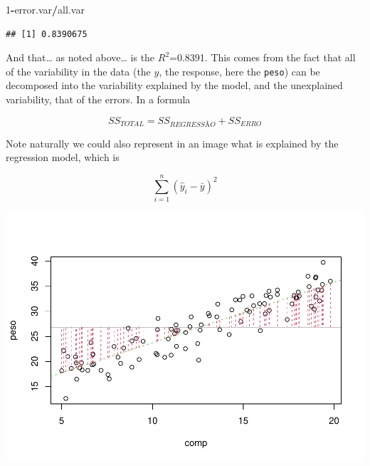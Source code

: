 \documentclass[
]{book}
\newenvironment{Shaded}{\begin{snugshade}}{\end{snugshade}}
\newcommand{\CommentTok}[1]{\textcolor[rgb]{0.56,0.35,0.01}{\textit{#1}}}
\newcommand{\DataTypeTok}[1]{\textcolor[rgb]{0.13,0.29,0.53}{#1}}
\newcommand{\DecValTok}[1]{\textcolor[rgb]{0.00,0.00,0.81}{#1}}
\newcommand{\KeywordTok}[1]{\textcolor[rgb]{0.13,0.29,0.53}{\textbf{#1}}}
\newcommand{\NormalTok}[1]{#1}
\newcommand{\OperatorTok}[1]{\textcolor[rgb]{0.81,0.36,0.00}{\textbf{#1}}}
\begin{document}
\begin{Shaded}
\begin{Highlighting}[]
\DecValTok{1}\OperatorTok{-}\NormalTok{error.var}\OperatorTok{/}\NormalTok{all.var}
\end{Highlighting}
\end{Shaded}

\begin{verbatim}
## [1] 0.8390675
\end{verbatim}

And that\ldots{} as noted above\ldots{} is the \(R^2\)=0.8391. This comes from the fact that all of the variability in the data (the \(y\), the response, here the \texttt{peso}) can be decomposed into the variability explained by the model, and the unexplained variability, that of the errors. In a formula

\[SS_{TOTAL}=SS_{REGRESSÃO}+SS_{ERRO}\]

Note naturally we could also represent in an image what is explained by the regression model, which is

\[\sum_{i=1}^n (\hat y_i- \bar y)^2\]

\begin{Shaded}
\end{Shaded}

\includegraphics{ECOMODbook_files/figure-latex/a6.18-1.pdf}
\end{document}
